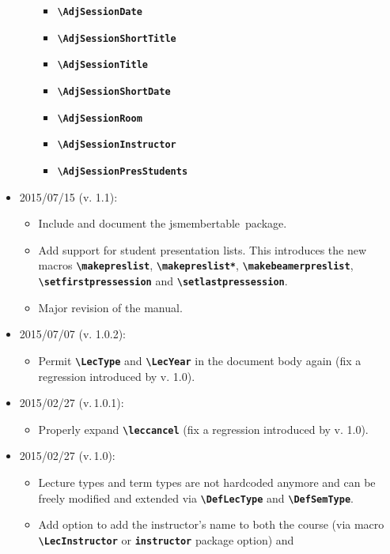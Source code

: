 \documentclass[english]{article}
\newcommand*\jmacro[1]{\textbf{\texttt{#1}}}
\newcommand*\jcsmacro[1]{\jmacro{\textbackslash{#1}}}
\newcommand*\joption[1]{\textbf{\texttt{#1}}}
\newcommand*\jsmt{\textsf{jsmembertable}}
\begin{document}
\begin{itemize}
\begin{itemize}
\begin{itemize}
		  \item \jcsmacro{AdjSessionDate}
		  \item \jcsmacro{AdjSessionShortTitle}
		  \item \jcsmacro{AdjSessionTitle}
		  \item \jcsmacro{AdjSessionShortDate}
		  \item \jcsmacro{AdjSessionRoom}
		  \item \jcsmacro{AdjSessionInstructor}\enlargethispage{\baselineskip}
		  \item \jcsmacro{AdjSessionPresStudents}
	  \end{itemize}
    \end{itemize}
\item 2015/07/15 (v. 1.1):
     \begin{itemize}
       \item Include and document the \jsmt\ package.
       \item Add support for student presentation lists. This introduces the new macros
             \jcsmacro{makepreslist}, \jcsmacro{makepreslist*},
             \jcsmacro{makebeamerpreslist}, \jcsmacro{setfirstpressession} and
             \jcsmacro{setlastpressession}.
       \item Major revision of the manual.
     \end{itemize}
\item 2015/07/07 (v. 1.0.2):
     \begin{itemize}
       \item Permit \jcsmacro{LecType} and \jcsmacro{LecYear} in the document body again
             (fix a regression introduced by v. 1.0).
     \end{itemize}
\item 2015/02/27 (v.\,1.0.1):
     \begin{itemize}
       \item Properly expand \jcsmacro{leccancel}
             (fix a regression introduced by v. 1.0).
     \end{itemize}
\item 2015/02/27 (v.\,1.0):
     \begin{itemize}
       \item Lecture types and term types are not hardcoded anymore and can be freely
             modified and extended via \jcsmacro{DefLecType} and \jcsmacro{DefSemType}.
       \item Add option to add the instructor's name to both the course (via macro
             \jcsmacro{LecInstructor} or \joption{instructor} package option) and

\end{itemize}
\end{itemize}
\end{document}
